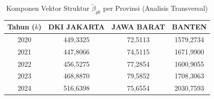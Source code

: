 \begin{table}[H]
\centering
\small
\caption{Komponen Vektor Struktur $\tilde{\beta}_{gk}$ per Provinsi (Analisis Transversal)} \label{tab:app1beta_provinsi}
\begin{tabular}{|c|c|c|c|}
\hline
\textbf{Tahun ($k$)} & \textbf{DKI JAKARTA} & \textbf{JAWA BARAT} & \textbf{BANTEN} \\
\hline
2020 & 449,3325 & 72,5113 & 1579,2734 \\
2021 & 447,8066 & 74,5115 & 1671,9900 \\
2022 & 456,5275 & 77,2854 & 1600,9055 \\
2023 & 468,8870 & 79,5852 & 1708,3063 \\
2024 & 516,6398 & 75,6554 & 2030,7593 \\
\hline
\end{tabular}
\end{table}